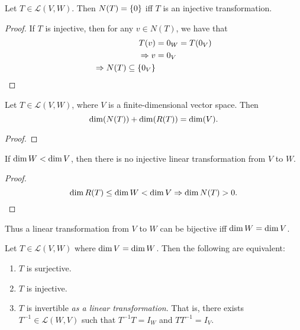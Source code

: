 
\begin{prop}[]
    Let $T \in \mathscr{L}(V, W)$. Then $N(T) = \set{0}$ iff $T$ is an injective transformation.
\end{prop}
\begin{proof}
    If $T$ is injective, then for any $v \in N(T)$, we have that \begin{align*}
        T(v) &= 0_{W} = T(0_{V}) \\
        \implies v &= 0_{V} \\
        \implies N(T) \subseteq \set{0_{V}}
    \end{align*}
\end{proof}

\begin{thm} \label{thm:rank_nullity}
    Let $T \in \mathscr{L}(V, W)$, where $V$ is a finite-dimensional vector space. Then \[
        \operatorname{dim}(N(T)) + \operatorname{dim}(R(T)) = \operatorname{dim}(V).
    \]
\end{thm}
\begin{proof}
\end{proof}

\begin{cor}[]
    If $\operatorname{dim} W < \operatorname{dim} V$, then there is no injective linear transformation from $V$ to $W$.
\end{cor}
\begin{proof}
    \[
        \operatorname{dim} R(T) \leq \operatorname{dim} W < \operatorname{dim} V \Rightarrow \operatorname{dim} N(T) > 0. \qedhere
    \]
\end{proof}
\begin{rem}
    Thus a linear transformation from $V$ to $W$ can be bijective iff $\operatorname{dim} W = \operatorname{dim} V$.
\end{rem}

\begin{cor}[]
    Let $T \in \mathscr{L}(V, W)$ where $\operatorname{dim} V = \operatorname{dim} W$. Then the following are equivalent:
    \begin{enumerate}[label=(\alph*)]
        \item $T$ is surjective.
        \item $T$ is injective.
        \item $T$ is invertible \emph{as a linear transformation}. That is, there exists $T^{-1} \in \mathscr{L}(W, V)$ such that $T^{-1}T = I_{W}$ and $TT^{-1} = I_{V}$.
    \end{enumerate}
\end{cor}

